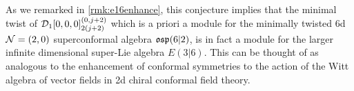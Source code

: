 \begin{rmk}\label{rmk:e36enhance}
As we remarked in \ref{rmk:e16enhance}, this conjecture implies that the minimal twist of $\mathcal{D}_1[0,0,0]^{(0,j+2)}_{2(j+2)}$ which is a priori a module for the minimally twisted 6d $\mathcal{N}=(2,0)$ superconformal algebra $\mathfrak{osp}(6|2)$, is in fact a module for the larger infinite dimensional super-Lie algebra $E(3|6)$. This can be thought of as analogous to the enhancement of conformal symmetries to the action of the Witt algebra of vector fields in 2d chiral conformal field theory.
\end{rmk}



%
